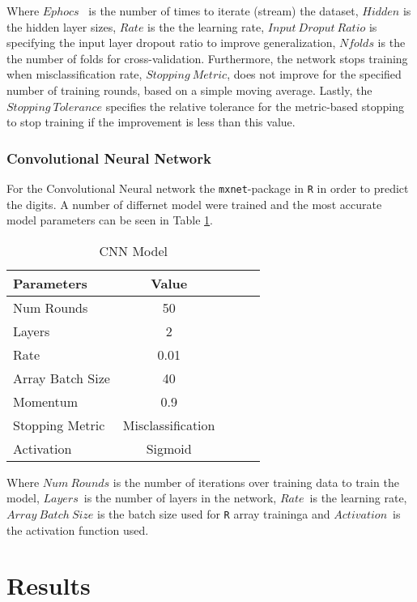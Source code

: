 \documentclass[a4paper,10pt]{article}
\begin{document}
Where $Ephocs$  is the number of times to iterate (stream) the dataset,
$Hidden$ is the hidden layer sizes, $Rate$ is the
the learning rate, $Input\ Droput\ Ratio$ is
specifying the input layer dropout ratio to improve generalization,
$Nfolds$ is the the number of folds for cross-validation. Furthermore,
the network stops training when misclassification rate,
$Stopping\ Metric$, does not improve for the specified number of
training rounds, based on a simple moving average. Lastly,
the $Stopping\ Tolerance$
specifies the relative tolerance for the metric-based
stopping to stop training if the improvement is less than this value. \\

\subsubsection{Convolutional Neural Network}
For the Convolutional Neural network the \texttt{mxnet}-package in \texttt{R}
in order to predict the digits. A number of differnet model were trained and the
most accurate model parameters can be seen in
Table {\ref{table:cnn_trained}}.

\begin{table}[H]
\centering
\begin{tabular}{l*{3}{c}r}
  Parameters & Value \\
  \hline
  Num Rounds & 50 \\
  Layers & 2 \\
  Rate & 0.01\\
  Array Batch Size & 40\\
  Momentum & 0.9 \\
  Stopping Metric & Misclassification \\
  Activation & Sigmoid
\end{tabular}
\caption{CNN Model}
\label{table:cnn_trained}
\end{table}

Where $Num\ Rounds$ is the number of iterations over training data to train the model,
$Layers$ is the number of layers in the network, $Rate$ is the learning rate,
$Array\ Batch\ Size$ is the batch size used for \texttt{R} array traininga and
$Activation$ is the activation function used.






\section{Results}
\end{document}
